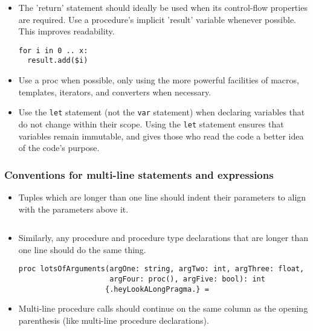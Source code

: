 \begin{itemize}
\item
  The 'return' statement should ideally be used when its control-flow
  properties are required. Use a procedure's implicit 'result' variable
  whenever possible. This improves readability.

\begin{verbatim}
for i in 0 .. x:
  result.add($i)
\end{verbatim}
\item
  Use a proc when possible, only using the more powerful facilities of
  macros, templates, iterators, and converters when necessary.
\item
  Use the \texttt{let} statement (not the \texttt{var} statement) when
  declaring variables that do not change within their scope. Using the
  \texttt{let} statement ensures that variables remain immutable, and
  gives those who read the code a better idea of the code's purpose.
\end{itemize}

\hypertarget{conventions-for-multi-line-statements-and-expressions}{%
\subsubsection{Conventions for multi-line statements and
expressions}\label{conventions-for-multi-line-statements-and-expressions}}

\begin{itemize}
\item
  Tuples which are longer than one line should indent their parameters
  to align with the parameters above it.

\begin{verbatim}
\end{verbatim}
\item
  Similarly, any procedure and procedure type declarations that are
  longer than one line should do the same thing.

\begin{verbatim}
proc lotsOfArguments(argOne: string, argTwo: int, argThree: float,
                     argFour: proc(), argFive: bool): int
                    {.heyLookALongPragma.} =
\end{verbatim}
\item
  Multi-line procedure calls should continue on the same column as the
  opening parenthesis (like multi-line procedure declarations).

\begin{verbatim}
\end{verbatim}
\end{itemize}
